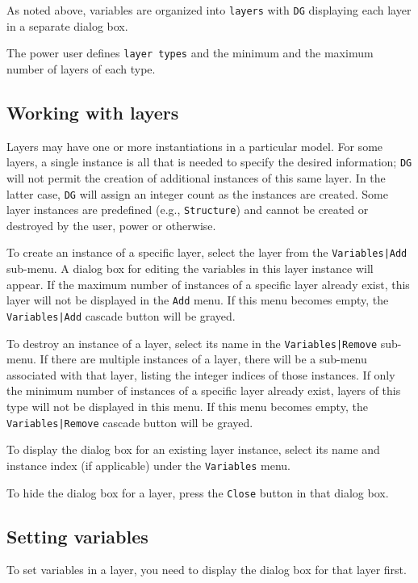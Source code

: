 \documentclass[a4paper,10pt]{report}
\begin{document}
As noted above, variables are organized
into {\tt layers} with {\tt DG} displaying each
layer in a separate dialog box.

The power user defines {\tt layer types} and the minimum and the
maximum number of layers of each type.

\subsection{Working with layers}

Layers may have one or more instantiations in a particular
model.  For some layers, a single instance is
all that is needed
to specify the desired information; {\tt DG} will not
permit the creation of additional instances of this same
layer.  In the latter case, {\tt DG} will assign an integer
count as the instances are created.
Some layer instances are predefined (e.g.,
{\tt Structure}) and cannot be created or destroyed
by the user, power or otherwise.

To create an instance of a specific layer, select the layer from the
{\tt Variables|Add} sub-menu. A dialog box for editing the variables in this
layer instance will appear. If the maximum number of instances of a
specific layer already exist, this layer will not be displayed in the {\tt Add}
menu. If this menu becomes empty, the {\tt Variables|Add} cascade button
will be grayed.

To destroy an instance of a layer, select its name in the {\tt Variables|Remove}
sub-menu. If there are multiple instances of a layer, there will be a sub-menu associated
with that layer, listing the integer indices of those instances.
If only the minimum number of instances of a specific layer
already exist, layers of this type will not be displayed in this menu.
If this menu becomes empty, the {\tt Variables|Remove} cascade button
will be grayed.

To display the dialog box for an existing layer instance, select its name
and instance index (if applicable) under
the {\tt Variables} menu.

To hide the dialog box for a layer, press the {\tt Close} button in
that dialog box.

\subsection{Setting variables}

To set variables in a layer, you need to display the dialog box for
that layer first.
\end{document}

